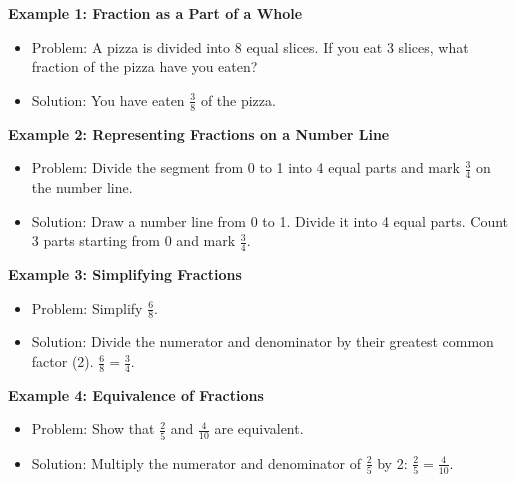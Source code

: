\documentclass[12pt]{article}
\begin{document}
\begin{tcolorbox}[colframe=black!60, colback=white, 
coltitle=black, colbacktitle=black!15, fonttitle=\bfseries\Large, 
title=Examples, halign title=center, left=10pt, right=10pt, top=10pt, bottom=15pt]
\textbf{Example 1: Fraction as a Part of a Whole}
\begin{itemize}
    \item Problem: A pizza is divided into 8 equal slices. If you eat 3 slices, what fraction of the pizza have you eaten?
    \item Solution: You have eaten \( \frac{3}{8} \) of the pizza.
\end{itemize}

\textbf{Example 2: Representing Fractions on a Number Line}
\begin{itemize}
    \item Problem: Divide the segment from 0 to 1 into 4 equal parts and mark \( \frac{3}{4} \) on the number line.
    \item Solution: Draw a number line from 0 to 1. Divide it into 4 equal parts. Count 3 parts starting from 0 and mark \( \frac{3}{4} \).
\end{itemize}

\textbf{Example 3: Simplifying Fractions}
\begin{itemize}
    \item Problem: Simplify \( \frac{6}{8} \).
    \item Solution: Divide the numerator and denominator by their greatest common factor (2). \( \frac{6}{8} = \frac{3}{4} \).
\end{itemize}

\textbf{Example 4: Equivalence of Fractions}
\begin{itemize}
    \item Problem: Show that \( \frac{2}{5} \) and \( \frac{4}{10} \) are equivalent.
    \item Solution: Multiply the numerator and denominator of \( \frac{2}{5} \) by 2: \( \frac{2}{5} = \frac{4}{10} \).
\end{itemize}
\end{tcolorbox}

\vspace{1em}
\end{document}
